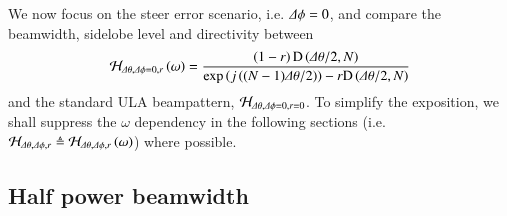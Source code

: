 \par We now focus on the steer error scenario, i.e. $\Delta\phi=0$, and compare the beamwidth, sidelobe level and directivity between  
\begin{equation}\label{eq_Hdphi0}
\Hr_{\dTheta,\dPhi=0,r}\rBrace{\omega}=
             \frac{\rBrace{1-r}\D{\dTheta/2}{N}}{\exp\rBrace{j\rBrace{(N-1)\dTheta/2}}-r\D{\dTheta/2}{N}}
\end{equation}
and the standard ULA beampattern, $\mathcal{H}_{\Delta\theta,\Delta\phi=0,r=0}$. To simplify the exposition, we shall suppress the $\omega$ dependency in the following sections (i.e. $\mathcal{H}_{\Delta\theta,\Delta\phi,r} \triangleq \mathcal{H}_{\Delta\theta,\Delta\phi,r}\left({\omega}\right)$) where possible.

\subsection*{Half power beamwidth}

